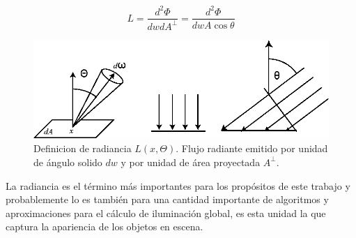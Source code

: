 \begin{equation}
    L = \frac{d^2\Phi}{dwdA^\bot} = \frac{d^2\Phi}{dwA\cos\theta}
	\label{eq:radiance_eq}
\end{equation}

\begin{figure}[H]
	\centering
	\includegraphics[width=0.85\linewidth]{media/radiance.eps}
	\caption{Definicion de radiancia $L(x,\Theta)$. Flujo radiante emitido por unidad de ángulo solido $dw$ y por unidad de área proyectada $A^\bot$.}
	\label{fig:radiance_fi}
\end{figure}

La radiancia es el término más importantes para los propósitos de este trabajo y probablemente lo es también para una cantidad importante de algoritmos y aproximaciones para el cálculo de iluminación global, es esta unidad la que captura la apariencia de los objetos en escena.
